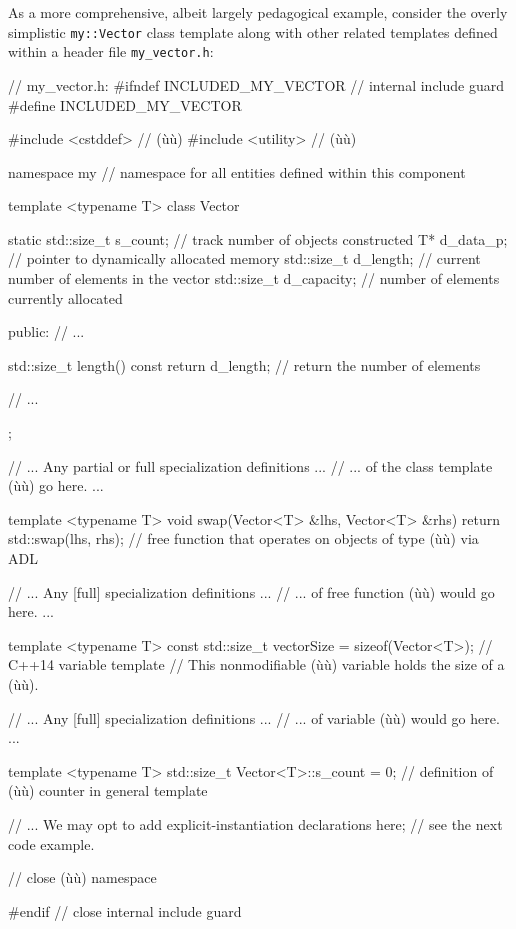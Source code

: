As a more comprehensive, albeit largely pedagogical example, consider
the overly simplistic \lstinline!my::Vector! class template along with
other related templates defined within a header file
\lstinline!my_vector.h!:

\begin{emcppslisting}[emcppsbatch={e1,e1b}]
// my_vector.h:
#ifndef INCLUDED_MY_VECTOR  // internal include guard
#define INCLUDED_MY_VECTOR

#include <cstddef>  // (ù{}ù)
#include <utility>  // (ù{}ù)

namespace my  // namespace for all entities defined within this component
{

template <typename T>
class Vector
{
    static std::size_t s_count; // track number of objects constructed
    T* d_data_p;                // pointer to dynamically allocated memory
    std::size_t d_length;       // current number of elements in the vector
    std::size_t d_capacity;     // number of elements currently allocated

public:
    // ...

    std::size_t length() const { return d_length; }
        // return the number of elements

    // ...
};

// ...          Any partial or full specialization definitions            ...
// ...          of the class template (ù{}ù) go here.                     ...

template <typename T>
void swap(Vector<T> &lhs, Vector<T> &rhs) { return std::swap(lhs, rhs); }
    // free function that operates on objects of type (ù{}ù) via ADL

// ...            Any [full] specialization definitions                   ...
// ...            of free function (ù{}ù) would go here.                    ...

template <typename T>
const std::size_t vectorSize = sizeof(Vector<T>);  // C++14 variable template
    // This nonmodifiable (ù{}ù) variable holds the size of a (ù{}ù).

// ...           Any [full] specialization definitions                    ...
// ...           of variable (ù{}ù) would go here.                    ...

template <typename T>
std::size_t Vector<T>::s_count = 0;
    // definition of (ù{}ù) counter in general template

// ... We may opt to add explicit-instantiation declarations here;
//     see the next code example.

}  // close (ù{}ù) namespace

#endif  // close internal include guard
\end{emcppslisting}

